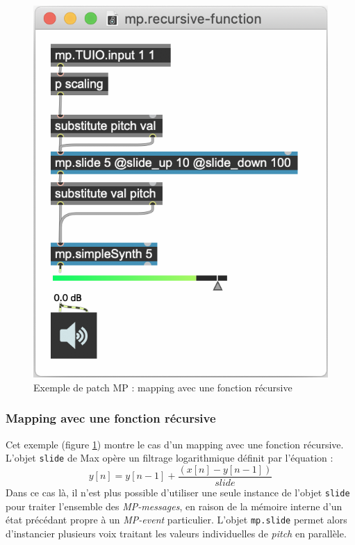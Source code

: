 \begin{figure}[!htbp]
\begin{minipage}[t]{0.485\textwidth}
	  	\includegraphics[width=\linewidth]{gfx/04_algorithms/MP-mappingRecursive.png}
		\caption[Exemple de patch MP : fonction récursive]{Exemple de patch MP : mapping avec une fonction récursive}
		\label{fig:algorithms:MP-recursive}
	\end{minipage}
\end{figure}

\subsubsection{Mapping avec une fonction récursive}

\noindent Cet exemple (figure \ref{fig:algorithms:MP-recursive}) montre le cas d'un mapping avec une fonction récursive. L'objet \verb|slide| de Max opère un filtrage logarithmique définit par l'équation :
 $$y[n] = y[n-1] + \frac{(x[n]-y[n-1])}{slide}$$ 
\noindent Dans ce cas là, il n'est plus possible d'utiliser une seule instance de l'objet \verb|slide| pour traiter l'ensemble des \textit{MP-messages}, en raison de la mémoire interne d'un état précédant propre à un \textit{MP-event} particulier. L'objet \verb|mp.slide| permet alors d'instancier plusieurs voix traitant les valeurs individuelles de \textit{pitch} en parallèle.


